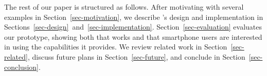 The rest of our paper is structured as follows. After motivating
\PocketMocker{} with several examples in Section~\ref{sec-motivation}, we
describe \PocketMocker{}'s design and implementation in
Sections~\ref{sec-design}~and~\ref{sec-implementation}.
Section~\ref{sec-evaluation} evaluates our \PocketMocker{} prototype, showing
both that \PocketMocker{} works and that smartphone users are interested in
using the capabilities it provides. We review related work in
Section~\ref{sec-related}, discuss future plans in Section~\ref{sec-future},
and conclude in Section~\ref{sec-conclusion}.
